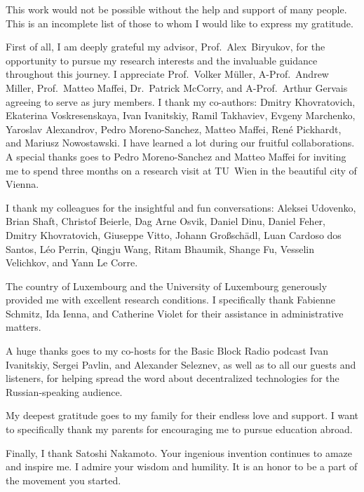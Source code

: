 
\begin{acknowledgements}
\addchaptertocentry{\acknowledgementname} %
This work would not be possible without the help and support of many people.
This is an incomplete list of those to whom I would like to express my gratitude.

First of all, I am deeply grateful my advisor, Prof.~Alex~Biryukov, for the opportunity to pursue my research interests and the invaluable guidance throughout this journey.
I appreciate Prof.~Volker M{\"u}ller, A-Prof.~Andrew Miller, Prof.~Matteo Maffei, Dr.~Patrick McCorry, and A-Prof.~Arthur Gervais agreeing to serve as jury members.
I thank my co-authors: Dmitry Khovratovich, Ekaterina Voskresenskaya, Ivan Ivanitskiy, Ramil Takhaviev, Evgeny Marchenko, Yaroslav Alexandrov, Pedro Moreno-Sanchez, Matteo Maffei, Ren{\'e} Pickhardt, and Mariusz Nowostawski.
I have learned a lot during our fruitful collaborations.
A special thanks goes to Pedro Moreno-Sanchez and Matteo Maffei for inviting me to spend three months on a research visit at TU~Wien in the beautiful city of Vienna.

I thank my colleagues for the insightful and fun conversations: Aleksei Udovenko, Brian Shaft, Christof Beierle, Dag Arne Osvik, Daniel Dinu, Daniel Feher, Dmitry Khovratovich, Giuseppe Vitto, Johann Gro{\ss}sch{\"a}dl, Luan Cardoso dos Santos, L{\'e}o Perrin, Qingju Wang, Ritam Bhaumik, Shange Fu, Vesselin Velichkov, and Yann Le Corre.

The country of Luxembourg and the University of Luxembourg generously provided me with excellent research conditions.
I specifically thank Fabienne Schmitz, Ida Ienna, and Catherine Violet for their assistance in administrative matters.

A huge thanks goes to my co-hosts for the Basic Block Radio podcast Ivan Ivanitskiy, Sergei Pavlin, and Alexander Seleznev, as well as to all our guests and listeners, for helping spread the word about decentralized technologies for the Russian-speaking audience.

My deepest gratitude goes to my family for their endless love and support.
I want to specifically thank my parents for encouraging me to pursue education abroad.

Finally, I thank Satoshi Nakamoto.
Your ingenious invention continues to amaze and inspire me.
I admire your wisdom and humility.
It is an honor to be a part of the movement you started.

\end{acknowledgements}

